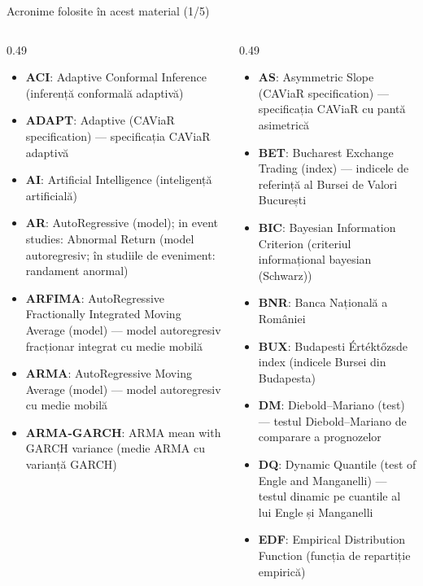 {
\begin{frame}[noframenumbering]
    \titlepage
\end{frame}
}
\begin{frame}{Acronime folosite în acest material (1/5)}
\begin{columns}[T]
\begin{column}{0.49\textwidth}
\begin{itemize}\setlength{\itemsep}{0pt}
    \item \textbf{ACI}: Adaptive Conformal Inference (inferență conformală adaptivă)
    \item \textbf{ADAPT}: Adaptive (CAViaR specification) — specificația CAViaR adaptivă
    \item \textbf{AI}: Artificial Intelligence (inteligență artificială)
    \item \textbf{AR}: AutoRegressive (model); in event studies: Abnormal Return (model autoregresiv; în studiile de eveniment: randament anormal)
    \item \textbf{ARFIMA}: AutoRegressive Fractionally Integrated Moving Average (model) — model autoregresiv fracționar integrat cu medie mobilă
    \item \textbf{ARMA}: AutoRegressive Moving Average (model) — model autoregresiv cu medie mobilă
    \item \textbf{ARMA-GARCH}: ARMA mean with GARCH variance (medie ARMA cu varianță GARCH)
\end{itemize}
\end{column}
\begin{column}{0.49\textwidth}
\begin{itemize}\setlength{\itemsep}{0pt}
    \item \textbf{AS}: Asymmetric Slope (CAViaR specification) — specificația CAViaR cu pantă asimetrică
    \item \textbf{BET}: Bucharest Exchange Trading (index) — indicele de referință al Bursei de Valori București
    \item \textbf{BIC}: Bayesian Information Criterion (criteriul informațional bayesian (Schwarz))
    \item \textbf{BNR}: Banca Națională a României
    \item \textbf{BUX}: Budapesti Értéktőzsde index (indicele Bursei din Budapesta)
    \item \textbf{DM}: Diebold–Mariano (test) — testul Diebold–Mariano de comparare a prognozelor
    \item \textbf{DQ}: Dynamic Quantile (test of Engle and Manganelli) — testul dinamic pe cuantile al lui Engle și Manganelli
    \item \textbf{EDF}: Empirical Distribution Function (funcția de repartiție empirică)
\end{itemize}
\end{column}
\end{columns}
\end{frame}
